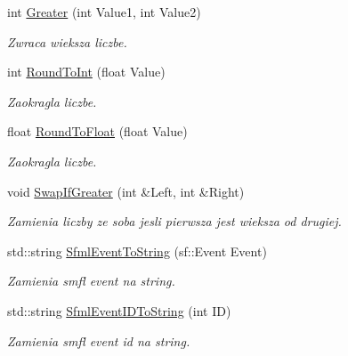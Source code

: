 \begin{DoxyCompactItemize}
int \mbox{\hyperlink{namespacetfp_a3e2e2d80cbd9c55a2893f360938adfd7}{Greater}} (int Value1, int Value2)
\begin{DoxyCompactList}\small\item\em Zwraca wieksza liczbe. \end{DoxyCompactList}\item 
\mbox{\label{namespacetfp_ac736147975b0d3aa813aae396c97a634}} 
int \mbox{\hyperlink{namespacetfp_ac736147975b0d3aa813aae396c97a634}{Round\+To\+Int}} (float Value)
\begin{DoxyCompactList}\small\item\em Zaokragla liczbe. \end{DoxyCompactList}\item 
\mbox{\label{namespacetfp_a3bc61c69f76d16db9078c7683e678124}} 
float \mbox{\hyperlink{namespacetfp_a3bc61c69f76d16db9078c7683e678124}{Round\+To\+Float}} (float Value)
\begin{DoxyCompactList}\small\item\em Zaokragla liczbe. \end{DoxyCompactList}\item 
\mbox{\label{namespacetfp_a07f8fa4f6455ae0af190205812ca1206}} 
void \mbox{\hyperlink{namespacetfp_a07f8fa4f6455ae0af190205812ca1206}{Swap\+If\+Greater}} (int \&Left, int \&Right)
\begin{DoxyCompactList}\small\item\em Zamienia liczby ze soba jesli pierwsza jest wieksza od drugiej. \end{DoxyCompactList}\item 
\mbox{\label{namespacetfp_a1d506bf9f00fa39a077a1c443c777684}} 
std\+::string \mbox{\hyperlink{namespacetfp_a1d506bf9f00fa39a077a1c443c777684}{Sfml\+Event\+To\+String}} (sf\+::\+Event Event)
\begin{DoxyCompactList}\small\item\em Zamienia smfl event na string. \end{DoxyCompactList}\item 
\mbox{\label{namespacetfp_a51384eb5f1f1cff1121f6fc3581aecb5}} 
std\+::string \mbox{\hyperlink{namespacetfp_a51384eb5f1f1cff1121f6fc3581aecb5}{Sfml\+Event\+I\+D\+To\+String}} (int ID)
\begin{DoxyCompactList}\small\item\em Zamienia smfl event id na string. \end{DoxyCompactList}\end{DoxyCompactItemize}


